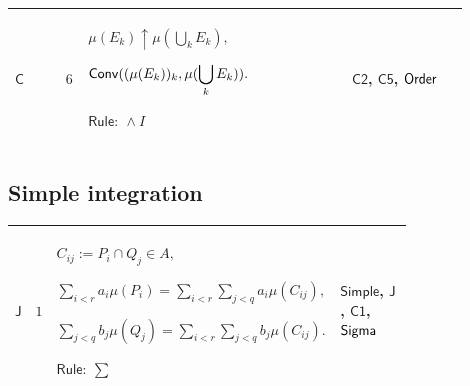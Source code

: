 \documentclass[12pt,reqno]{amsart}
\theoremstyle{blueplain}
\numberwithin{equation}{section}
\newlength{\FATOUOneColumnBody}
\begin{document}
{\scriptsize \setlength{\parskip}{0pt}\nointerlineskip
\noindent 
\begin{tabular}{|@{}>{\centering\arraybackslash}m{0.10658\linewidth}|>{\centering\arraybackslash}m{0.03553\linewidth}|>{\centering\arraybackslash}m{0.52105\linewidth}|>{\centering\arraybackslash}m{0.23684\linewidth}|}
\hline
\hypertarget{proof:C6}{$\displaystyle \mathsf{C}$} & $\displaystyle 6$ & $%
\displaystyle \mu(E_k)\uparrow\mu(\bigcup_kE_k),$\par$\displaystyle \mathsf{%
Conv}((\mu(E_k))_k,\mu(\bigcup_kE_k)).$\par$\displaystyle \mathsf{Rule}:\
\land I$ & \hyperlink{proof:C2}{$\displaystyle \mathsf{C2}$}, \hyperlink{proof:C5}%
{$\displaystyle \mathsf{C5}$}, \hyperlink{lem:Order}{$\displaystyle \mathsf{%
Order}$} \\ \hline
\end{tabular}%
}

\subsection{\protect\scriptsize Simple integration}

{\scriptsize \setlength{\parskip}{0pt}\nointerlineskip
\noindent 
\begin{tabular}{|@{}>{\centering\arraybackslash}m{\FATOUOneColumnBody}|}
\hline
$\displaystyle \mathsf{Context\_J}:=$\par$\displaystyle s,t:\mathsf{S}_A,$%
\par$\displaystyle \mathsf{Rep}(s;r,a,P),\quad\mathsf{Rep}(t;q,b,Q).$ \\ 
\hline
\end{tabular}%
}

{\scriptsize \setlength{\parskip}{0pt}\nointerlineskip
\noindent 
\begin{tabular}{|@{}>{\centering\arraybackslash}m{0.10658\linewidth}|>{\centering\arraybackslash}m{0.03553\linewidth}|>{\centering\arraybackslash}m{0.52105\linewidth}|>{\centering\arraybackslash}m{0.23684\linewidth}|}
\hline
\hypertarget{proof:J1}{$\displaystyle \mathsf{J}$} & $\displaystyle 1$ & $%
\displaystyle C_{ij}:=P_i\cap Q_j\in A,$\par$\displaystyle %
\sum_{i<r}a_i\mu(P_i)=\sum_{i<r}\sum_{j<q}a_i\mu(C_{ij}),$\par$\displaystyle %
\sum_{j<q}b_j\mu(Q_j)=\sum_{i<r}\sum_{j<q}b_j\mu(C_{ij}).$\par$\displaystyle 
\mathsf{Rule}:\ \sum$ & \hyperlink{def:Simple}{$\displaystyle \mathsf{Simple}
$}, \hyperlink{def:J}{$\displaystyle \mathsf{J}$}, \hyperlink{proof:C1}{$%
\displaystyle \mathsf{C1}$}, \hyperlink{ax:Sigma}{$\displaystyle \mathsf{%
Sigma}$} \\ \hline
\end{tabular}%
}
\end{document}
